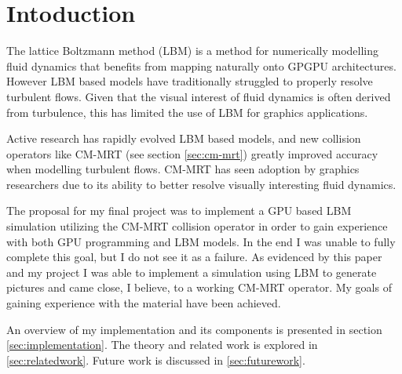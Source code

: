 \section{Intoduction}

The lattice Boltzmann method (LBM) 
is a method for numerically modelling fluid dynamics
that benefits from mapping naturally onto GPGPU architectures.
However LBM based models have traditionally struggled to 
properly resolve turbulent flows.
Given that the visual interest of fluid dynamics is often 
derived from turbulence, this has limited the use of LBM 
for graphics applications.

Active research has rapidly evolved LBM based models,
and new collision operators like CM-MRT (see section \ref{sec:cm-mrt})
greatly improved accuracy when modelling turbulent flows.
CM-MRT has seen adoption by graphics 
researchers \cite{Li2020, Li2024, Lyu2021} due
to its ability to better resolve visually interesting
fluid dynamics.

The proposal for my final project was to
implement a GPU based LBM simulation utilizing the CM-MRT collision 
operator in order to gain experience with both GPU programming and 
LBM models.
In the end I was unable to fully complete this goal, 
but I do not see it as a failure.
As evidenced by this paper and my project I was able to implement 
a simulation using LBM to generate pictures and came close, I believe,
to a working CM-MRT operator.
My goals of gaining experience with the material have been 
achieved.

An overview of my implementation and its 
components is presented in section \ref{sec:implementation}.
The theory and related work is explored in \ref{sec:relatedwork}.
Future work is discussed in \ref{sec:futurework}.
